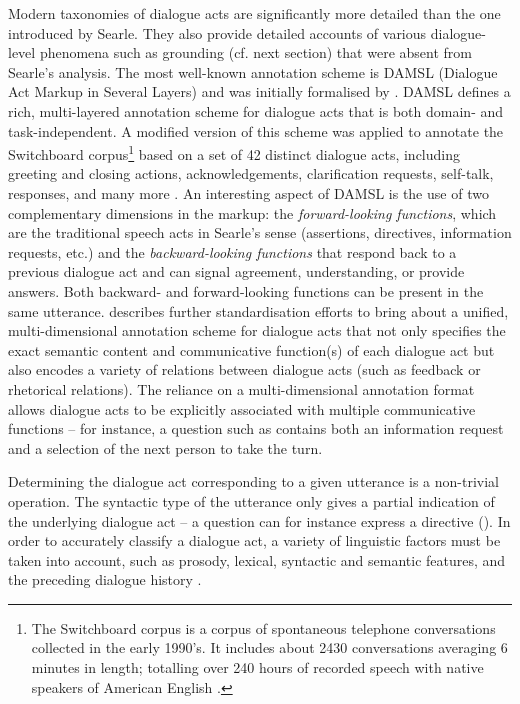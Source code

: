 Modern taxonomies of dialogue acts are significantly more detailed than the one introduced by Searle.  They also provide detailed accounts of various dialogue-level phenomena such as grounding (cf. next section) that were absent from Searle's analysis. The most well-known annotation scheme is DAMSL (Dialogue Act Markup in Several Layers) and was initially formalised by \cite{Core1997}.  DAMSL defines a rich, multi-layered annotation scheme for dialogue acts that is both domain- and task-independent.  A modified version of this scheme was applied to annotate the Switchboard corpus\footnote{The Switchboard corpus is a corpus of spontaneous telephone conversations collected in the early 1990's.  It includes about 2430 conversations averaging 6 minutes in length; totalling over 240 hours of recorded speech with native speakers of American English \citep{Godfrey1992}.} based on a set of 42 distinct dialogue acts, including greeting and closing actions, acknowledgements, clarification requests, self-talk, responses, and many more \citep{Jurafsky1997}.  An interesting aspect of DAMSL is the use of two complementary dimensions in the markup: the \textit{forward-looking functions}, which are the traditional speech acts in Searle's sense (assertions, directives, information requests, etc.) and the \textit{backward-looking functions} that respond back to a previous dialogue act and can signal agreement, understanding, or provide answers.  Both backward- and forward-looking functions can be present in the same utterance. \cite{Bunt:2011} describes further standardisation efforts to bring about a unified, multi-dimensional annotation scheme for dialogue acts that not only specifies the exact semantic content and communicative function(s) of each dialogue act but also encodes a variety of relations between dialogue acts (such as feedback or rhetorical relations). The reliance on a multi-dimensional annotation format allows dialogue acts to be explicitly associated with multiple communicative functions -- for instance, a question such as  contains both an information request and a selection of the next person to take the turn.  

Determining the dialogue act corresponding to a given utterance is a non-trivial operation. The syntactic type of the utterance only gives a partial indication of the underlying dialogue act -- a question can for instance express a directive ().  In order to accurately classify a dialogue act, a variety of linguistic factors must be taken into account, such as prosody, lexical, syntactic and semantic features, and the preceding dialogue history \citep{jurafsky1998,Shriberg1998,stolcke2000,Keizer2007}.


